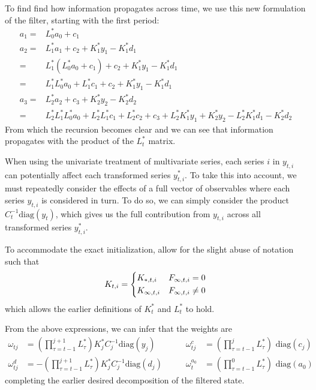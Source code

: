 \documentclass[12pt]{article}
\begin{document}
	To find find how information propagates across time, we use this new formulation of the filter, starting with the first period:
	\begin{align*}
	a_1 =& L_0^* a_0 + c_1 \\
	a_2 =& L_1^* a_1 + c_2 + K_1^* y_1 - K_1^*  d_1 \\
		=& L_1^*(L_0^* a_0 + c_1) + c_2 + K_1^* y_1 - K_1^* d_1 \\
		=& L_1^* L_0^* a_0 + L_1^* c_1 + c_2 + K_1^* y_1 - K_1^* d_1 \\
	a_3 =& L_2^* a_2 + c_3 + K_2^* y_2 - K_2^* d_2 \\
		=& L_2^* L_1^* L_0^* a_0 + L_2^* L_1^* c_1 + L_2^* c_2 + c_3 + L_2^* K_1^* y_1  + K_2^* y_2 - L_2^* K_1^* d_1 - K_2^* d_2 
	\end{align*}
	From which the recursion becomes clear and we can see that information propagates with the product of the $L_t^*$ matrix. 

	When using the univariate treatment of multivariate series, each series $i$ in $y_{t,i}$ can potentially affect each transformed series $y_{t,i}^*$. To take this into account, we must repeatedly consider the effects of a full vector of observables where each series $y_{t,i}$ is considered in turn. To do so, we can simply consider the product $C_t^{-1} \text{diag}(y_t)$, which gives us the full contribution from $y_{t,i}$ across all transformed series $y_{t,i}^*$. 

	To accommodate the exact initialization, allow for the slight abuse of notation such that 
	\begin{align*}
	K_{t,i} = \begin{dcases}
		K_{*,t,i} & F_{\infty,t,i} = 0 \\ 
		K_{\infty,t,i} & F_{\infty,t,i} \neq 0
	\end{dcases}
	\end{align*}
	which allows the earlier definitions of $K_t^*$ and $L_t^*$ to hold.
	
	From the above expressions, we can infer that the weights are 
	\begin{align*}
	\omega_{tj} &= \left( \prod_{\tau=t-1}^{j+1} L_\tau^* \right) K_j^* C_j^{-1} \text{diag}(y_j) & \qquad 	
	\omega_{tj}^c &= \left( \prod_{\tau=t-1}^{j} L_\tau^* \right) \text{ diag} (c_j) \\ 
	\omega_{tj}^d &= -\left( \prod_{\tau=t-1}^{j+1} L_\tau^* \right) K_j^* C_j^{-1} \text{diag}(d_j) & \qquad	
	\omega_t^{a_0} &= \left( \prod_{\tau=t-1}^0 L_\tau^* \right) \text{ diag} (a_0)
	\end{align*}
	completing the earlier desired decomposition of the filtered state. 
\end{document}
